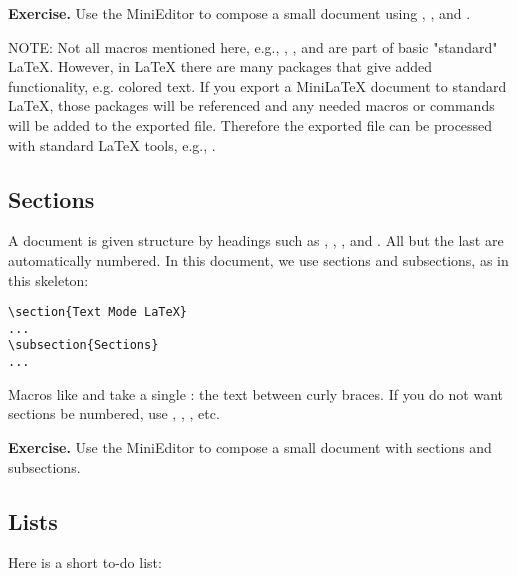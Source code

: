 \textbf{Exercise.} Use the MiniEditor to compose a small document using , ,  and .

NOTE: Not all macros mentioned here, e.g., , ,  and  are part of basic "standard" LaTeX.  However, in LaTeX there are many packages that give added functionality, e.g. colored text.  If you export a MiniLaTeX document to standard LaTeX, those packages will be referenced and any needed macros or commands will be added to the exported file.  Therefore the exported file can be processed with standard LaTeX tools, e.g., .



\subsection{Sections}

A document is given structure by headings such as , , , and .  All but the last are automatically numbered.  In this document, we use sections and subsections, as in this skeleton:

\begin{verbatim}
\section{Text Mode LaTeX}
...
\subsection{Sections}
...
\end{verbatim}

Macros like  and  take a single : the text between curly braces.  If you do not want sections be numbered, use , , , etc.

\textbf{Exercise.} Use the MiniEditor to compose a small document with sections and subsections.


\subsection{Lists}

Here is a short to-do list:

